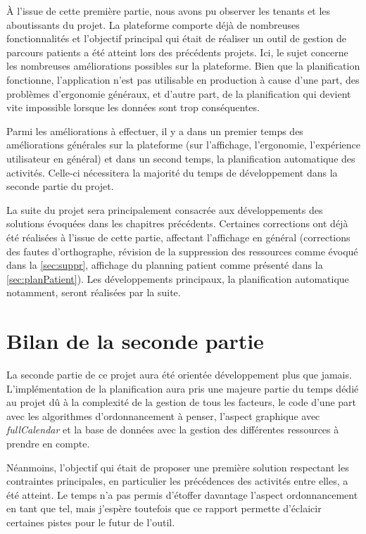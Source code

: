 \documentclass[noposter]{polytech/polytech}
\begin{document}
À l'issue de cette première partie, nous avons pu observer les tenants et les aboutissants du projet. La plateforme comporte déjà de nombreuses fonctionnalités et l'objectif principal qui était de réaliser un outil de gestion de parcours patients a été atteint lors des précédents projets. Ici, le sujet concerne les nombreuses améliorations possibles sur la plateforme. Bien que la planification fonctionne, l'application n'est pas utilisable en production à cause d'une part, des problèmes d'ergonomie généraux, et d'autre part, de la planification qui devient vite impossible lorsque les données sont trop conséquentes.

Parmi les améliorations à effectuer, il y a dans un premier temps des améliorations générales sur la plateforme (sur l'affichage, l'ergonomie, l'expérience utilisateur en général) et dans un second temps, la planification automatique des activités. Celle-ci nécessitera la majorité du temps de développement dans la seconde partie du projet.

La suite du projet sera principalement consacrée aux développements des solutions évoquées dans les chapitres précédents. Certaines corrections ont déjà été réalisées à l'issue de cette partie, affectant l'affichage en général (corrections des fautes d'orthographe, révision de la suppression des ressources comme évoqué dans la \autoref{sec:suppr}, affichage du planning patient comme présenté dans la \autoref{sec:planPatient}). Les développements principaux, la planification automatique notamment, seront réalisées par la suite. 


\section*{Bilan de la seconde partie}

La seconde partie de ce projet aura été orientée développement plus que jamais. L'implémentation de la planification aura pris une majeure partie du temps dédié au projet dû à la complexité de la gestion de tous les facteurs, le code d'une part avec les algorithmes d'ordonnancement à penser, l'aspect graphique avec \textit{fullCalendar} et la base de données avec la gestion des différentes ressources à prendre en compte. 

Néanmoins, l'objectif qui était de proposer une première solution respectant les contraintes principales, en particulier les précédences des activités entre elles, a été atteint. Le temps n'a pas permis d'étoffer davantage l'aspect ordonnancement en tant que tel, mais j'espère toutefois que ce rapport permette d'éclaicir certaines pistes pour le futur de l'outil.
\end{document}
